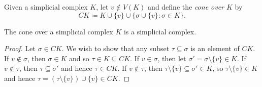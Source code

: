 \begin{definition}
    Given a simplicial complex $K$, let $v \notin V(K)$ and define the \emph{cone over $K$} by
    \[
        \mathit{CK} \coloneqq K \cup \{v\} \cup \{\sigma \cup \{v\} : \sigma \in K\}.
    \]
\end{definition}

\begin{proposition}
    The cone over a simplicial complex $K$ is a simplicial complex.
\end{proposition}
\begin{proof}
    Let $\sigma \in \mathit{CK}$. We wish to show that any subset $\tau \subseteq \sigma$ is an element of $\mathit{CK}$. If $v \notin \sigma$, then
    $\sigma \in K$ and so $\tau \in K \subseteq \mathit{CK}$. If $v \in \sigma$, then let $\sigma' = \sigma \setminus \{v\} \in K$. If
    $v \notin \tau$, then $\tau \subseteq \sigma'$ and hence $\tau \in \mathit{CK}$. If $v \notin \tau$, then $\tau \setminus \{v\} \subseteq
    \sigma' \in K$, so $\tau \setminus \{v\} \in K$ and hence $\tau = (\tau \setminus \{v\}) \cup \{v\} \in \mathit{CK}$.
\end{proof}

